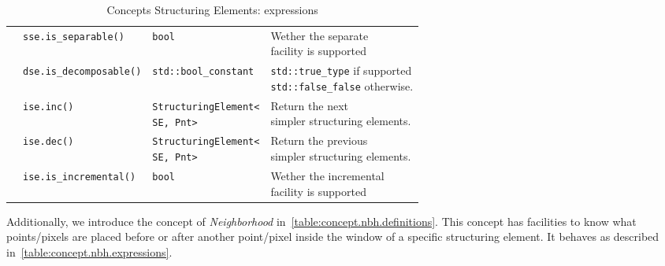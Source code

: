\begin{table}[!htbp]
\begin{scriptsize}
\begin{tabular}{llll}
      \multicolumn{1}{c|}{}                                     & \texttt{sse.is\_separable()}                          & \texttt{bool}                             & \makecell[l]{Wether the separate        \\ facility is supported}\\
      \cline{1-4}
      \multicolumn{1}{c|}{\multirow{4}{*}{\makecell[l]{Incremental                                                                                                                                            \\StructuringElement}}} & \texttt{dse.is\_decomposable()} & \texttt{std::bool\_constant} & \makecell[l]{\texttt{std::true\_type} if supported\\ \texttt{std::false\_false} otherwise.}\\
      \multicolumn{1}{c|}{}                                     & \texttt{ise.inc()}                                    & \makecell[l]{\texttt{StructuringElement<}                                           \\\texttt{SE, Pnt>}} & \makecell[l]{Return the next            \\ simpler structuring elements.}\\
      \multicolumn{1}{c|}{}                                     & \texttt{ise.dec()}                                    & \makecell[l]{\texttt{StructuringElement<}                                           \\\texttt{SE, Pnt>}} & \makecell[l]{Return the previous        \\ simpler structuring elements.}\\
      \multicolumn{1}{c|}{}                                     & \texttt{ise.is\_incremental()}                        & \texttt{bool}                             & \makecell[l]{Wether the incremental     \\ facility is supported}\\
      \cline{1-4}
    \end{tabular}
    \smallskip

    \caption{Concepts Structuring Elements: expressions}
  \end{scriptsize}
  \label{table:concept.se.expressions}
\end{table}

Additionally, we introduce the concept of \emph{Neighborhood} in~\cref{table:concept.nbh.definitions}. This concept has
facilities to know what points/pixels are placed before or after another point/pixel inside the window of a specific
structuring element. It behaves as described in~\cref{table:concept.nbh.expressions}.

